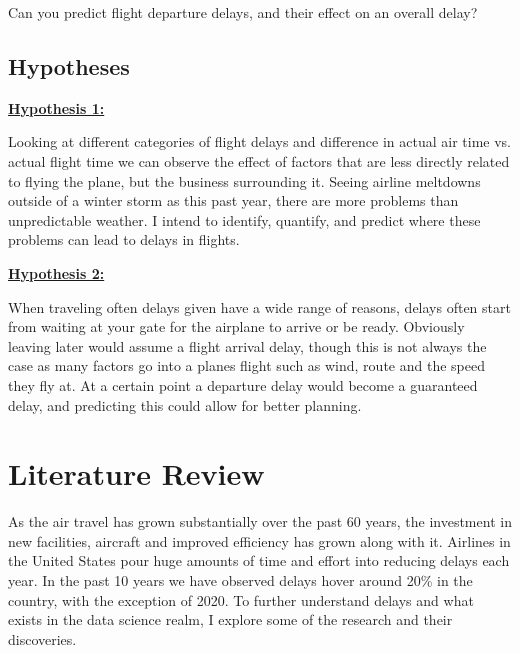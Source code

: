 \documentclass[a4paper,12pt]{article}
\begin{document}
Can you predict flight departure delays, and their effect on an overall delay?



\subsection{Hypotheses}

\textbf{\underline{Hypothesis 1:}}

Looking at different categories of flight delays and difference in actual air time vs. actual flight
time we can observe the effect of factors that are less directly related to flying the plane, but the
business surrounding it. Seeing airline meltdowns outside of a winter storm as this past year,
there are more problems than unpredictable weather. I intend to identify, quantify, and predict
where these problems can lead to delays in flights.

\noindent \textbf{\underline{Hypothesis 2:}}

When traveling often delays given have a wide range of reasons, delays often start from waiting at your gate 
for the airplane to arrive or be ready. Obviously leaving later would assume a flight arrival delay, though this is not always the case
as many factors go into a planes flight such as wind, route and the speed they fly at. At a certain point a departure delay 
would become a guaranteed delay, and predicting this could allow for better planning.



\pagebreak

\section{Literature Review} \label{lit_review}

As the air travel has grown substantially over the past 60 years, the investment in new facilities, aircraft and improved efficiency has grown along with it.
Airlines in the United States pour huge amounts of time and effort into reducing delays each year. In the past 10 years we have observed delays hover around 20\%
in the country, with the exception of 2020. To further understand delays and what exists in the data science realm, I explore some of the research and their discoveries.
\end{document}
